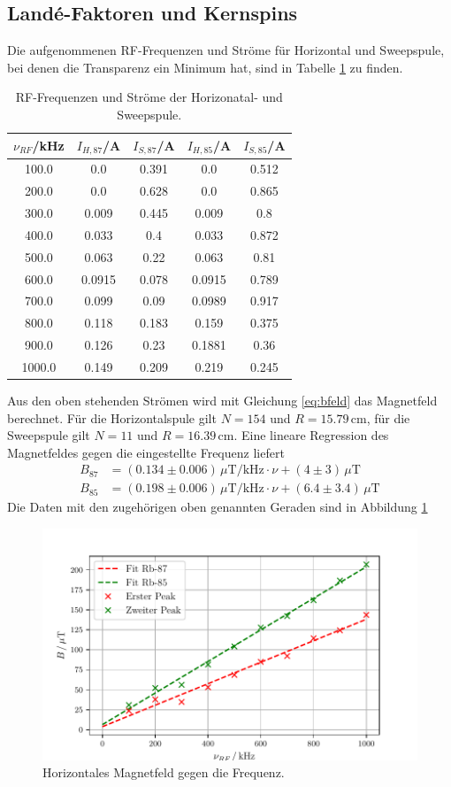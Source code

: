 \subsection{Landé-Faktoren und Kernspins}
Die aufgenommenen RF-Frequenzen und Ströme für Horizontal und Sweepspule, bei denen die Transparenz ein Minimum hat, sind in Tabelle \ref{tab:rf} zu finden.
\begin{table}
  \centering
  \caption{RF-Frequenzen und Ströme der Horizonatal- und Sweepspule.}
  \label{tab:rf}
  \begin{tabular}{c | c | c | c | c}
    \toprule
    $\nu_{RF}$/kHz & $I_{H,87}$/A & $I_{S,87}$/A& $I_{H,85}$/A& $I_{S,85}$/A \\
    \midrule
    100.0 & 0.0 & 0.391 & 0.0 & 0.512 \\
    200.0 & 0.0 & 0.628 & 0.0 & 0.865 \\
    300.0 & 0.009 & 0.445 & 0.009 & 0.8 \\
    400.0 & 0.033 & 0.4 & 0.033 & 0.872 \\
    500.0 & 0.063 & 0.22 & 0.063 & 0.81 \\
    600.0 & 0.0915 & 0.078 & 0.0915 & 0.789 \\
    700.0 & 0.099 & 0.09 & 0.0989 & 0.917 \\
    800.0 & 0.118 & 0.183 & 0.159 & 0.375 \\
    900.0 & 0.126 & 0.23 & 0.1881 & 0.36 \\
    1000.0 & 0.149 & 0.209 & 0.219 & 0.245 \\
    \bottomrule
  \end{tabular}
\end{table}
\FloatBarrier
Aus den oben stehenden Strömen wird mit Gleichung \ref{eq:bfeld} das Magnetfeld berechnet.
Für die Horizontalspule gilt $N=154$ und $R=15.79\,$cm, für die Sweepspule gilt $N=11$ und $R=16.39\,$cm.
Eine lineare Regression des Magnetfeldes gegen die eingestellte Frequenz liefert
\begin{align*}
  B_{87} &= (0.134\pm0.006)\,\mu\text{T/kHz}\cdot\nu + (4\pm3)\,\mu\text{T}\\
  B_{85} &= (0.198\pm0.006)\,\mu\text{T/kHz}\cdot\nu + (6.4\pm3.4)\,\mu\text{T}
\end{align*}
Die Daten mit den zugehörigen oben genannten Geraden sind in Abbildung \ref{fig:rf}
\begin{figure}
  \centering
  \includegraphics{plot1.pdf}
  \caption{Horizontales Magnetfeld gegen die Frequenz.}
  \label{fig:rf}
\end{figure}

